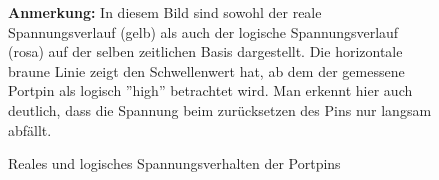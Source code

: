 \begin{figure}[h]
\begin{center}
 \caption{\label{impl_messbild} Reales und logisches Spannungsverhalten der Portpins}
\end{center}
 \textbf{Anmerkung:} In diesem Bild sind sowohl der reale Spannungsverlauf (gelb) als
 auch der logische Spannungsverlauf (rosa) auf der selben zeitlichen Basis dargestellt.
 Die horizontale braune Linie zeigt den Schwellenwert hat, ab dem der gemessene Portpin
 als logisch ''high'' betrachtet wird. Man erkennt hier auch deutlich, dass die Spannung
 beim zurücksetzen des Pins nur langsam abfällt.
\end{figure}

